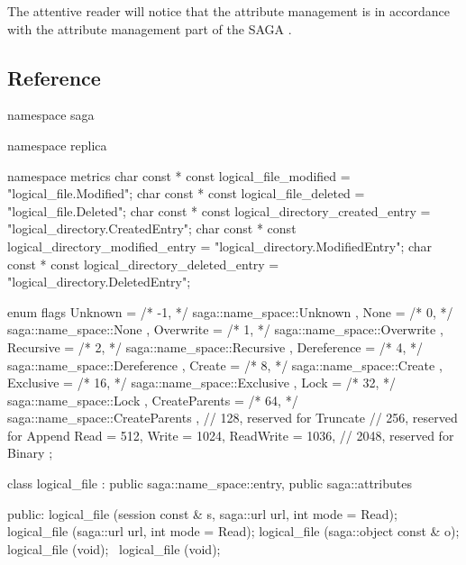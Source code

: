   The attentive reader will notice that the attribute management
  is in accordance with the attribute management part of the SAGA
  \LF.

 \subsection{Reference}

 \begin{mycode}[label=Prototypes: saga::replica]
  namespace saga
  {
    namespace replica
    {
      namespace metrics
      {
        char const * const logical_file_modified            
                   =      "logical_file.Modified";
        char const * const logical_file_deleted             
                   =      "logical_file.Deleted";
        char const * const logical_directory_created_entry  
                   =      "logical_directory.CreatedEntry";
        char const * const logical_directory_modified_entry 
                   =      "logical_directory.ModifiedEntry";
        char const * const logical_directory_deleted_entry  
                   =      "logical_directory.DeletedEntry";
      }

      enum flags
      {
        Unknown         = /*  -1, */  saga::name_space::Unknown       ,
        None            = /*   0, */  saga::name_space::None          ,
        Overwrite       = /*   1, */  saga::name_space::Overwrite     ,
        Recursive       = /*   2, */  saga::name_space::Recursive     ,
        Dereference     = /*   4, */  saga::name_space::Dereference   ,
        Create          = /*   8, */  saga::name_space::Create        ,
        Exclusive       = /*  16, */  saga::name_space::Exclusive     ,
        Lock            = /*  32, */  saga::name_space::Lock          ,
        CreateParents   = /*  64, */  saga::name_space::CreateParents ,
                          // 128,          reserved for Truncate
                          // 256,          reserved for Append
        Read            =    512,
        Write           =   1024,
        ReadWrite       =   1036,
                         // 2048,          reserved for Binary
      };

      class logical_file
          : public saga::name_space::entry,
            public saga::attributes
      {
        public:
            logical_file (session const      & s,
                          saga::url            url,
                          int                  mode = Read);
            logical_file (saga::url            url,
                          int                  mode = Read);
            logical_file (saga::object const & o);
            logical_file (void);
           ~logical_file (void);

}}}
\end{mycode}
